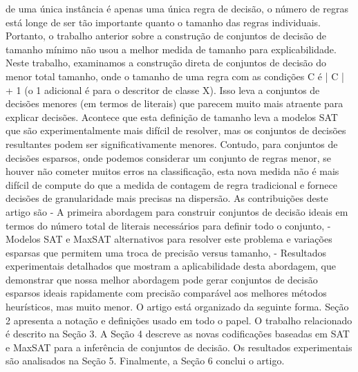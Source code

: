 de uma única instância é apenas uma única regra de decisão, o número de regras está longe de ser
tão importante quanto o tamanho das regras individuais. Portanto, o trabalho anterior sobre a construção de conjuntos de decisão de tamanho mínimo não usou a melhor medida de tamanho para explicabilidade.
Neste trabalho, examinamos a construção direta de conjuntos de decisão do menor total
tamanho, onde o tamanho de uma regra com as condições C é | C | + 1 (o 1 adicional é para o
descritor de classe X). Isso leva a conjuntos de decisões menores (em termos de literais) que parecem
muito mais atraente para explicar decisões.
Acontece que esta definição de tamanho leva a modelos SAT que são experimentalmente
mais difícil de resolver, mas os conjuntos de decisões resultantes podem ser significativamente menores. Contudo,
para conjuntos de decisões esparsos, onde podemos considerar um conjunto de regras menor, se houver
não cometer muitos erros na classificação, esta nova medida não é mais difícil de
compute do que a medida de contagem de regra tradicional e fornece decisões de granularidade mais precisas
na dispersão.
As contribuições deste artigo são
- A primeira abordagem para construir conjuntos de decisão ideais em termos do número total de
literais necessários para definir todo o conjunto,
- Modelos SAT e MaxSAT alternativos para resolver este problema e variações esparsas
que permitem uma troca de precisão versus tamanho,
- Resultados experimentais detalhados que mostram a aplicabilidade desta abordagem, que
demonstrar que nossa melhor abordagem pode gerar conjuntos de decisão esparsos ideais rapidamente
com precisão comparável aos melhores métodos heurísticos, mas muito menor.
O artigo está organizado da seguinte forma. Seção 2 apresenta a notação e definições
usado em todo o papel. O trabalho relacionado é descrito na Seção 3. A Seção 4 descreve
as novas codificações baseadas em SAT e MaxSAT para a inferência de conjuntos de decisão. Os resultados experimentais são analisados ​​na Seção 5. Finalmente, a Seção 6 conclui o artigo.
